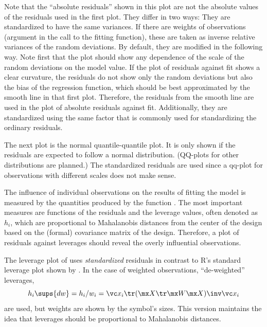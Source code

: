 \documentclass[11pt]{article}\usepackage[]{graphicx}\usepackage[]{color}
\begin{document}
Note that the ``absolute residuals'' shown in this plot are not the 
absolute values of the residuals used in the first plot. 
They differ in two ways:
\Itm
They are standardized to have the same variances.
If there are weights of observations (argument  in the call to
the fitting function), these are taken as inverse relative variances of
the random deviations.
\Itm
By default, they are modified in the following way.
Note first that the plot should show any dependence of the scale of the
random deviations on the model value.
If the plot of residuals against fit shows a clear curvature, the
residuals do not show only the random deviations but also the bias of the
regression function, which should be best approximated by the smooth line
in that first plot. Therefore, the residuals from the smooth line are 
used in the plot of absolute residuals against fit.
Additionally, they are standardized using the same factor that is commonly
used for standardizing the ordinary residuals.



The next plot is the normal quantile-quantile plot. It is only shown if the
residuals are expected to follow a normal distribution.
(QQ-plots for other distributions are planned.)
The standardized residuals are used since a qq-plot for observations with 
different scales does not make sense.

The influence of individual observations on the results of fitting the model
is measured by the quantities produced by the function .
The most important measures are functions of the residuals and the 
leverage values, often denoted as $h_i$, which are proportional to
Mahalanobis distances from the center of the design based on the 
(formal) covariance matrix of the design.
Therefore, a plot of residuals against leverages should reveal the overly
influential observations.

The leverage plot of  uses \emph{standardized} residuals
in contrast to R's standard leverage plot shown by .
In the case of weighted observations, ``de-weighted'' leverages,
\[
  h_i\sups{dw} = h_i/w_i = \vc x_i\tr (\mx X\tr \mx W \mx X)\inv \vc x_i
\]
are used, but weights are shown by the symbol's sizes.
This version maintains the idea that leverages should be proportional to 
Mahalanobis distances.
\end{document}
